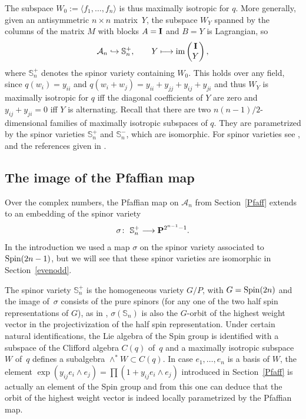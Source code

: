 \documentclass[10pt,a4paper]{amsart}
\newcommand{\PP}{{\bf P}}
\newcommand{\bS}{{\mathbb S}}
\newcommand{\cA}{{\cal A}}
\numberwithin{equation}{section}
\providecommand{\cal}{\mathcal}
\begin{document}
The subspace $W_0:=\langle f_1,\ldots,f_n\rangle$ is thus maximally isotropic for $q$. More generally, given an antisymmetric $n\times n$ matrix~$Y$, the subspace $W_Y$ spanned by the columns of the matrix $M$ with blocks $A={\bf I}$ and $B=Y$ is Lagrangian, so
\begin{gather*}
\cA_n \hookrightarrow \bS_n^+,\qquad Y \longmapsto \operatorname{im} \begin{pmatrix} {\bf I}\\Y\end{pmatrix},
\end{gather*}
where $\bS_n^+$ denotes the spinor variety containing $W_0$. This holds over any field, since $q(w_i)=y_{ii}$ and $q(w_i+w_j)=y_{ii}+y_{jj}+y_{ij}+y_{ji}$ and thus $W_Y$ is maximally isotropic for $q$ iff the diagonal coefficients of $Y$ are zero and $y_{ij}+y_{ji}=0$ iff $Y$ is alternating. Recall that there are two $n(n-1)/2$-dimensional families of maximally isotropic subspaces of $q$. They are parametrized by the spinor varieties $\bS_{n}^+$ and $\bS_{n}^-$, which are isomorphic. For spinor varieties see \cite{C}, \cite[Section~11.7]{P} and the references given in \cite[Section~6.0]{RS}.

\subsection{The image of the Pfaffian map}\label{impfaff}
Over the complex numbers, the Pfaffian map on $\cA_n$ from Section~\ref{Pfaff} extends to an embedding of the spinor variety
\begin{gather*}
\sigma\colon \ \bS_n^+ \longrightarrow \PP^{2^{n-1}-1}.
\end{gather*}
In the introduction we used a map $\sigma$ on the spinor variety associated to ${\rm Spin}(2n-1)$, but we will see that these spinor varieties are isomorphic in Section~\ref{evenodd}.

The spinor variety $\bS_{n}^+$ is the homogeneous variety $G/P$, with $G={\rm Spin}(2n)$ and the image of~$\sigma$ consists of the pure spinors (for any one of the two half spin representations of $G$), as in \cite[Section~11.7.2]{P}, $\sigma(\bS_n)$ is also the $G$-orbit of the highest weight vector in the projectivization of the half spin representation. Under certain natural identifications, the Lie algebra of the Spin group is identified with a subspace of the Clifford algebra $C(q)$ of~$q$ and a maximally isotropic subspace~$W$ of~$q$ defines a subalgebra $\wedge^*W\subset C(q)$. In case $e_1,\ldots,e_n$ is a basis of $W$, the element $\exp(y_{ij}e_i\wedge e_j)=\prod(1+y_{ij}e_i\wedge e_j)$ introduced in Section~\ref{Pfaff} is actually an element of the Spin group and from this one can deduce that the orbit of the highest weight vector is indeed locally parametrized by the Pfaffian map.
\end{document}
